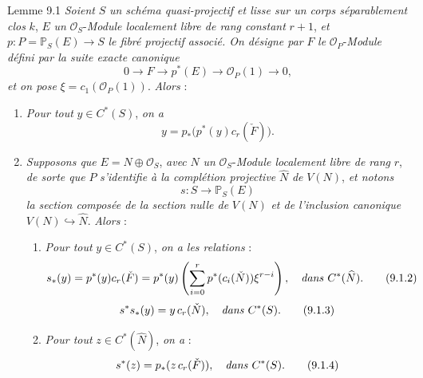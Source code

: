 \begin{statement}{Lemme 9.1}
\emph{Soient} $S$ \emph{un schéma quasi-projectif et lisse sur un corps séparablement clos} $k$, $E$ \emph{un} $\mathcal{O}_S$-\emph{Module localement libre de rang constant} $r+1$, \emph{et} $p:P=\mathbb{P}_S(E)\to S$ \emph{le fibré projectif associé. On désigne par} $F$ \emph{le} $\mathcal{O}_P$-\emph{Module défini par la suite exacte canonique}
\[
0\to F\to p^*(E)\to\mathcal{O}_P(1)\to0,
\tag{9.1.0}
\]
\emph{et on pose} $\xi=c_1(\mathcal{O}_P(1))$. \emph{Alors} :
\begin{enumerate}[label=(\roman*)]
\item \emph{Pour tout} $y\in C^*(S)$, \emph{on a}
\[
y=p_*\bigl(p^*(y)c_r(\check F)\bigr).
\tag{9.1.1}
\]
\item \emph{Supposons que} $E=N\oplus\mathcal{O}_S$, \emph{avec} $N$ \emph{un} $\mathcal{O}_S$-\emph{Module localement libre de rang} $r$, \emph{de sorte que} $P$ \emph{s'identifie à la complétion projective} $\widehat N$ \emph{de} $V(N)$, \emph{et notons}
\[
s:S\to\mathbb{P}_S(E)
\]
\emph{la section composée de la section nulle de} $V(N)$ \emph{et de l'inclusion canonique} $V(N)\hookrightarrow\widehat N$. \emph{Alors} :
\begin{enumerate}[label=(\alph*)]
\item \emph{Pour tout} $y\in C^*(S)$, \emph{on a les relations} :
\[
s_*(y)=p^*(y)c_r(\check F)=p^*(y)\left(\sum_{i=0}^r p^*(c_i(\check N))\xi^{r-i}\right),
\quad\text{\emph{dans} }C^*(\widehat N).
\tag{9.1.2}
\]
\[
s^*s_*(y)=y\,c_r(\check N),\quad\text{\emph{dans} }C^*(S).
\tag{9.1.3}
\]
\item
\emph{Pour tout} $z\in C^*(\widehat N)$, \emph{on a} :
\[
s^*(z)=p_*(z\,c_r(\check F)),\quad\text{\emph{dans} }C^*(S).
\tag{9.1.4}
\]
\end{enumerate}
\end{enumerate}
\end{statement}

